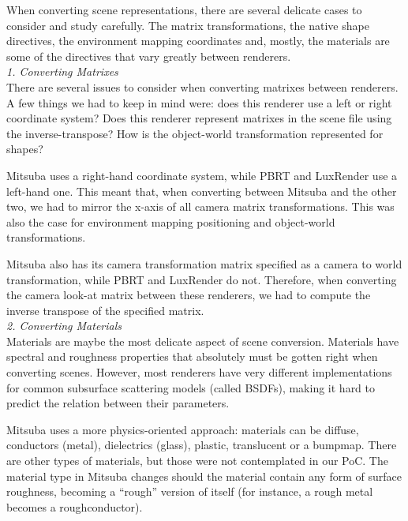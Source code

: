 When converting scene representations, there are several delicate cases to
consider and study carefully. The matrix transformations, the native shape
directives, the environment mapping coordinates and, mostly, the materials are
some of the directives that vary greatly between renderers. \\

\textit{1. Converting Matrixes} \\
There are several issues to consider when converting matrixes between renderers.
A few things we had to keep in mind were: does this renderer use a left or right
coordinate system? Does this renderer represent matrixes in the scene file using
the inverse-transpose? How is the object-world transformation represented for
shapes?

Mitsuba uses a right-hand coordinate system, while PBRT and LuxRender use a
left-hand one. This meant that, when converting between Mitsuba and the other
two, we had to mirror the x-axis of all camera matrix transformations. This was
also the case for environment mapping positioning and object-world
transformations.

Mitsuba also has its camera transformation matrix specified as a camera to world
 transformation, while PBRT and LuxRender do not. Therefore, when converting the
camera look-at matrix between these renderers, we had to compute the inverse
transpose of the specified matrix. \\

\textit{2. Converting Materials} \\
Materials are maybe the most delicate aspect of scene conversion. Materials have
spectral and roughness properties that absolutely must be gotten right when
converting scenes. However, most renderers have very different implementations
for common subsurface scattering models (called BSDFs), making it hard to
predict the relation between their parameters.

Mitsuba uses a more physics-oriented approach: materials can be diffuse,
conductors (metal), dielectrics (glass), plastic, translucent or a bumpmap.
There are other types of materials, but those were not contemplated in our PoC.
The material type in Mitsuba changes should the material contain any form of
surface roughness, becoming a ``rough'' version of itself (for instance, a rough
metal becomes a roughconductor).

